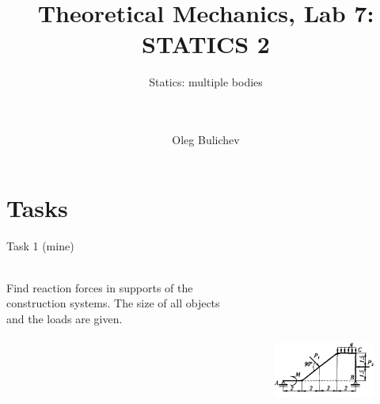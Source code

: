 \documentclass[aspectratio=169]{beamer}
\title[Theoretical Mechanics]{Theoretical Mechanics, Lab 7: STATICS 2} %
\subtitle{Statics: multiple bodies
\\ \ \\ \ 
         } %
\author{Oleg Bulichev}
\newcommand{\fbckg}[1]{\usebackgroundtemplate{\texttt{[image: \#1]}}}%
\begin{document}
\setlength{\abovedisplayskip}{0pt}
\setlength{\belowdisplayskip}{0pt}
\setlength{\abovedisplayshortskip}{0pt}
\setlength{\belowdisplayshortskip}{0pt}

\fbckg{fibeamer/figs/title_page.png}

\fbckg{fibeamer/figs/common.png}


\section*{Tasks}

\begin{frame}[t]{Task 1 (mine)}
    \framesubtitle{}
    \begin{columns}[T,onlytextwidth]
        \begin{column}{0.49\textwidth}
            Find reaction forces in supports of the construction systems. The size of all objects and the loads are given.
        \end{column}
        \begin{column}{0.49\textwidth}
            \begin{figure}[H]
                \centering\includegraphics[height=6cm,width=1\textwidth,keepaspectratio]{image23.png}
            \end{figure}
        \end{column}
    \end{columns}
    \end{frame}
\end{document}
